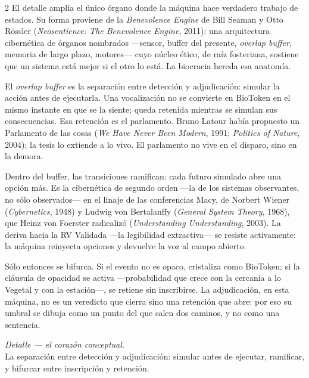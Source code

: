 \documentclass[11pt]{article}
\begin{document}
\begin{multicols}{2}\small\setlength{\parindent}{1em}\setlength{\parskip}{0.45em}
El detalle amplía el único órgano donde la máquina hace verdadero trabajo de estados. Su forma proviene de la \emph{Benevolence Engine} de Bill Seaman y Otto Rössler (\emph{Neosentience: The Benevolence Engine}, 2011): una arquitectura cibernética de órganos nombrados —sensor, buffer del presente, \emph{overlap buffer}, memoria de largo plazo, motores— cuyo núcleo ético, de raíz fosteriana, sostiene que un sistema está mejor si el otro lo está. La biocracia hereda esa anatomía.

El \emph{overlap buffer} es la separación entre detección y adjudicación: simular la acción antes de ejecutarla. Una vocalización no se convierte en BioToken en el mismo instante en que se la siente; queda retenida mientras se simulan sus consecuencias. Esa retención es el parlamento. Bruno Latour había propuesto un Parlamento de las cosas (\emph{We Have Never Been Modern}, 1991; \emph{Politics of Nature}, 2004); la tesis lo extiende a lo vivo. El parlamento no vive en el disparo, sino en la demora.

Dentro del buffer, las transiciones ramifican: cada futuro simulado abre una opción más. Es la cibernética de segundo orden —la de los sistemas observantes, no sólo observados— en el linaje de las conferencias Macy, de Norbert Wiener (\emph{Cybernetics}, 1948) y Ludwig von Bertalanffy (\emph{General System Theory}, 1968), que Heinz von Foerster radicalizó (\emph{Understanding Understanding}, 2003). La deriva hacia la RV Validada —la legibilidad extractiva— se resiste activamente: la máquina reinyecta opciones y devuelve la voz al campo abierto.

Sólo entonces se bifurca. Si el evento no es opaco, cristaliza como BioToken; si la cláusula de opacidad se activa —probabilidad que crece con la cercanía a lo Vegetal y con la estación—, se retiene sin inscribirse. La adjudicación, en esta máquina, no es un veredicto que cierra sino una retención que abre: por eso su umbral se dibuja como un punto del que salen dos caminos, y no como una sentencia.
\end{multicols}

\newpage
{\large\itshape Detalle — el corazón conceptual.}\\[-0.3em]
{\small\color{ink!60}La separación entre detección y adjudicación: simular antes de ejecutar, ramificar, y bifurcar entre inscripción y retención.}
\end{document}
